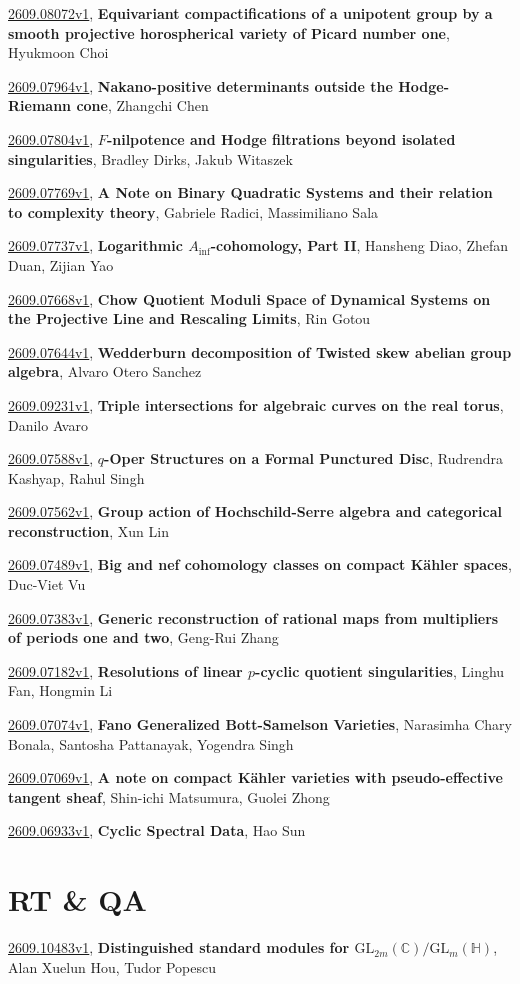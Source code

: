\documentclass[9pt, a4paper]{article}
\theoremstyle{plain}
\theoremstyle{definition}
\theoremstyle{remark}
\newcommand{\arxiv}[3]{\href{https://arxiv.org/abs/#1}{#1}, \textbf{\textcolor{arxivblue}{#2}}, #3}
\begin{document}
\arxiv{2609.08072v1}{Equivariant compactifications of a unipotent group by a smooth projective horospherical variety of Picard number one}{Hyukmoon Choi}

\arxiv{2609.07964v1}{Nakano-positive determinants outside the Hodge-Riemann cone}{Zhangchi Chen}

\arxiv{2609.07804v1}{$F$-nilpotence and Hodge filtrations beyond isolated singularities}{Bradley Dirks, Jakub Witaszek}

\arxiv{2609.07769v1}{A Note on Binary Quadratic Systems and their relation to complexity theory}{Gabriele Radici, Massimiliano Sala}

\arxiv{2609.07737v1}{Logarithmic $A_{\mathrm{inf}}$-cohomology, Part II}{Hansheng Diao, Zhefan Duan, Zijian Yao}

\arxiv{2609.07668v1}{Chow Quotient Moduli Space of Dynamical Systems on the Projective Line and Rescaling Limits}{Rin Gotou}

\arxiv{2609.07644v1}{Wedderburn decomposition of Twisted skew abelian group algebra}{Alvaro Otero Sanchez}

\arxiv{2609.09231v1}{Triple intersections for algebraic curves on the real torus}{Danilo Avaro}

\arxiv{2609.07588v1}{$q$-Oper Structures on a Formal Punctured Disc}{Rudrendra Kashyap, Rahul Singh}

\arxiv{2609.07562v1}{Group action of Hochschild-Serre algebra and categorical reconstruction}{Xun Lin}

\arxiv{2609.07489v1}{Big and nef cohomology classes on compact Kähler spaces}{Duc-Viet Vu}

\arxiv{2609.07383v1}{Generic reconstruction of rational maps from multipliers of periods one and two}{Geng-Rui Zhang}

\arxiv{2609.07182v1}{Resolutions of linear $p$-cyclic quotient singularities}{Linghu Fan, Hongmin Li}

\arxiv{2609.07074v1}{Fano Generalized Bott-Samelson Varieties}{Narasimha Chary Bonala, Santosha Pattanayak, Yogendra Singh}

\arxiv{2609.07069v1}{A note on compact Kähler varieties with pseudo-effective tangent sheaf}{Shin-ichi Matsumura, Guolei Zhong}

\arxiv{2609.06933v1}{Cyclic Spectral Data}{Hao Sun}


\section{RT \& QA}
\arxiv{2609.10483v1}{Distinguished standard modules for $\mathrm{GL}_{2m}(\mathbb{C})/\mathrm{GL}_m(\mathbb{H})$}{Alan Xuelun Hou, Tudor Popescu}
\end{document}
